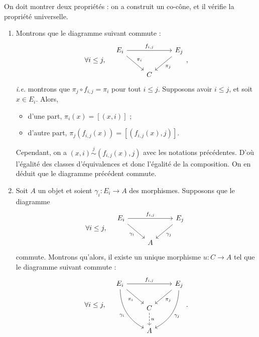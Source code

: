 \documentclass{../../td}
\begin{document}
\begin{enumerate}
      On doit montrer deux propriétés : on a construit un co-cône, et il vérifie la propriété universelle.
      \begin{enumerate}
        \item Montrons que le diagramme suivant commute :
          \[
          \forall i \le j, \quad \begin{tikzcd}
            E_i \arrow{rr}{f_{i,j}}\arrow{dr}{\pi_i} && E_j \arrow{dl}{\pi_j}\\
            & C
          \end{tikzcd}
          ,\] 
          \textit{i.e.} montrons que $\pi_j \circ f_{i,j} = \pi_i$ pour tout $i \le j$.
          Supposons avoir $i \le j$, et soit $x \in E_i$.
          Alors,
          \begin{itemize}
            \item d'une part, $\pi_i(x) = [(x,i)]$ ;
            \item d'autre part, $\pi_j(f_{i,j}(x)) = [(f_{i,j}(x), j)]$.
          \end{itemize}
          Cependant, on a $(x, i) \overset j \sim (f_{i,j}(x), j)$ avec les notations précédentes.
          D'où l'égalité des classes d'équivalences et donc l'égalité de la composition.
          On en déduit que le diagramme précédent commute.
        \item Soit $A$ un objet et soient $\gamma_i : E_i \to A$ des morphismes.
          Supposons que le diagramme 
          \[
          \forall i \le j, \quad \begin{tikzcd}
            E_i \arrow{rr}{f_{i,j}}\arrow[swap]{dr}{\gamma_i} && E_j \arrow{dl}{\gamma_j}\\
            & A
          \end{tikzcd}
          \]
          commute.
          Montrons qu'alors, il existe un unique morphisme $u : C \to A$ tel que le diagramme suivant commute :
          \[
          \forall i \le j, \quad \begin{tikzcd}
            E_i \arrow[bend right,swap]{rdd}{\gamma_i} \arrow{rr}{f_{i,j}}\arrow[swap]{dr}{\pi_i} && E_j \arrow{dl}{\pi_j} \arrow[bend left]{ldd}{\gamma_j}\\
            & C \arrow[dashed]{d}{u}\\
            & A
          \end{tikzcd}
          .\]


\end{enumerate}
\end{enumerate}
\end{document}
